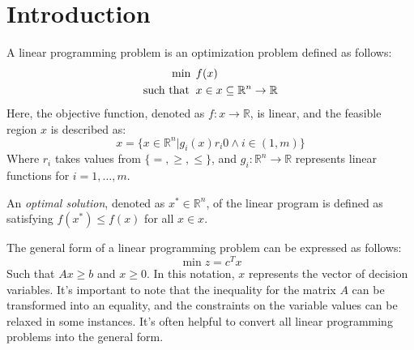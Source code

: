 \section{Introduction}

\begin{definition}
    A linear programming problem is an optimization problem defined as follows:
    \begin{align*}
        \min                      \:&\:f(x)           \\
        \textnormal{such that }     &\: x \in x \subseteq \mathbb{R}^n \rightarrow \mathbb{R} 
    \end{align*}
    Here, the objective function, denoted as $f:x \rightarrow \mathbb{R}$, is linear, and the feasible region $x$ is described as:
    \[x=\{x\in\mathbb{R}^n|g_i(x)r_i0\land i\in(1,m)\}\]
    Where $r_i$ takes values from $\{=,\geq,\leq\}$, and $g_i:\mathbb{R}^n\rightarrow\mathbb{R}$ represents linear functions for $i=1,\dots,m$.
\end{definition}
\begin{definition}
    An \emph{optimal solution}, denoted as $x^{*} \in \mathbb{R}^n$, of the linear program is defined as satisfying $f(x^{*}) \leq f(x)$ for all $x\in x$.
\end{definition}
The general form of a linear programming problem can be expressed as follows:
\[\min{z}=c^Tx\]
Such that $Ax \geq b$ and $x \geq 0$. 
In this notation, $x$ represents the vector of decision variables.
It's important to note that the inequality for the matrix $A$ can be transformed into an equality, and the constraints on the variable values can be relaxed in some instances.
It's often helpful to convert all linear programming problems into the general form.

